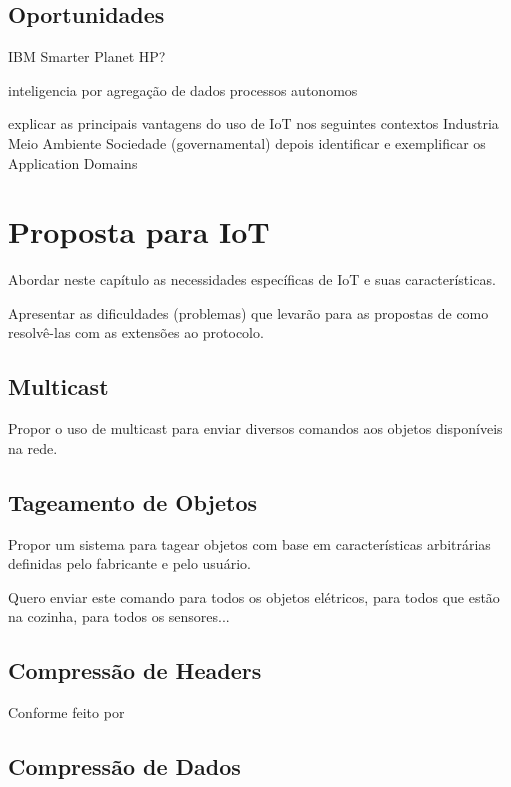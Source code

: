 \documentclass[twoside,english,brazilian]{UNISINOSmonografia}
\begin{document}
\section{Oportunidades}

	IBM Smarter Planet
	HP?
	
	inteligencia por agregação de dados
	processos autonomos
	
	explicar as principais vantagens do uso de IoT nos seguintes contextos
	Industria
	Meio Ambiente
	Sociedade (governamental)
	depois identificar e exemplificar os Application Domains 
	\cite{Sundmaeker2010}


\chapter{Proposta para IoT}

	Abordar neste capítulo as necessidades específicas de IoT e suas 
	características.
	
	Apresentar as dificuldades (problemas) que levarão para as propostas
	de como resolvê-las com as extensões ao protocolo.
	
	
	\section{Multicast}
		
		Propor o uso de multicast para enviar diversos comandos aos objetos
		disponíveis na rede.
		
		
	\section{Tageamento de Objetos}
		
		Propor um sistema para tagear objetos com base em características
		arbitrárias definidas pelo fabricante e pelo usuário.
		
		Quero enviar este comando para todos os objetos elétricos, para
		todos que estão na cozinha, para todos os sensores...
		
		
	\section{Compressão de Headers}
		
		Conforme feito por \cite{Choi2009}
		
		
	\section{Compressão de Dados}
		
\end{document}
